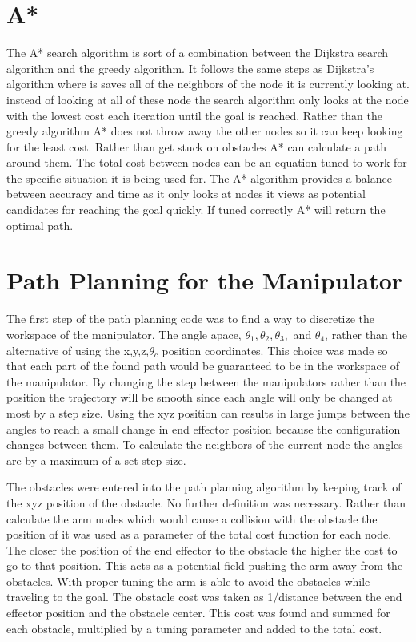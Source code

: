 \documentclass[letterpaper,12pt]{report}
\begin{document}
\section{A*}
The A* search algorithm is sort of a combination between the Dijkstra search algorithm and the greedy algorithm. It follows the same steps as Dijkstra's algorithm where is saves all of the neighbors of the node it is currently looking at. instead of looking at all of these node the search algorithm only looks at the node with the lowest cost each iteration until the goal is reached. Rather than the greedy algorithm A* does not throw away the other nodes so it can keep looking for the least cost. Rather than get stuck on obstacles A* can calculate a path around them. The total cost between nodes can be an equation tuned to work for the specific situation it is being used for. The A* algorithm provides a balance between accuracy and time as it only looks at nodes it views as potential candidates for reaching the goal quickly. If tuned correctly A* will return the optimal path. 

\section{Path Planning for the Manipulator}
The first step of the path planning code was to find a way to discretize the workspace of the manipulator. The angle apace, $\theta_1, \theta_2, \theta_3,$ and $\theta_4$, rather than the alternative of using the x,y,z,$\theta_c$ position coordinates. This choice was made so that each part of the found path would be guaranteed to be in the workspace of the manipulator. By changing the step between the manipulators rather than the position the trajectory will be smooth since each angle will only be changed at most by a step size. Using the xyz position can results in large jumps between the angles to reach a small change in end effector position because the configuration changes between them. To calculate the neighbors of the current node the angles are by a maximum of a set step size. 

The obstacles were entered into the path planning algorithm by keeping track of the xyz position of the obstacle. No further definition was necessary. Rather than calculate the arm nodes which would cause a collision with the obstacle the position of it was used as a parameter of the total cost function for each node. The closer the position of the end effector to the obstacle the higher the cost to go to that position. This acts as a potential field pushing the arm away from the obstacles. With proper tuning the arm is able to avoid the obstacles while traveling to the goal. The obstacle cost was taken as 1/distance between the end effector position and the obstacle center. This cost was found and summed for each obstacle, multiplied by a tuning parameter and added to the total cost.
\end{document}
